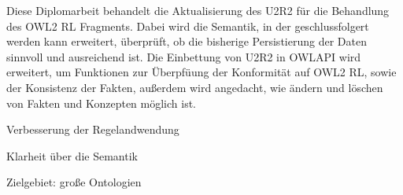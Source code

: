 Diese Diplomarbeit behandelt die Aktualisierung des U2R2 für die Behandlung des OWL2 RL Fragments. Dabei wird die Semantik, in der geschlussfolgert werden kann erweitert, überprüft, ob die bisherige Persistierung der Daten sinnvoll und ausreichend ist. Die Einbettung von U2R2 in OWLAPI wird erweitert, um Funktionen zur Überpfüung der Konformität auf OWL2 RL, sowie der Konsistenz der Fakten, außerdem wird angedacht, wie ändern und löschen von Fakten und Konzepten möglich ist.

Verbesserung der Regelandwendung

Klarheit über die Semantik

Zielgebiet: große Ontologien 